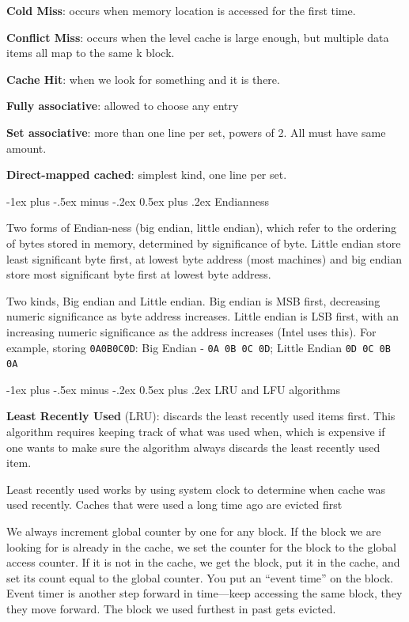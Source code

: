 \documentclass[10pt,landscape]{article}
\makeatletter
\renewcommand{\section}{\@startsection{section}{1}{0mm}%
                                {-1ex plus -.5ex minus -.2ex}%
                                {0.5ex plus .2ex}%
                                {\normalfont\large\bfseries}}
\makeatother
\begin{document}
\begin{multicols}{3}
{\bf Cold Miss}: occurs when memory location is accessed for the first time. 

{\bf Conflict Miss}:  occurs when the level cache is large enough, but multiple data items all map to the same k block. 

{\bf Cache Hit}: when we look for something and it is there. 


{\bf Fully associative}: allowed to choose any entry

{\bf Set associative}:  more than one line per set, powers of 2. All
must have same amount.

{\bf Direct-mapped cached}: simplest kind, one line per set.

\section{Endianness}

Two forms of Endian-ness (big endian, little endian), which refer to the ordering of bytes stored in memory, determined by significance of byte. 
Little endian store least significant byte first, at lowest byte address (most machines) and big endian store most significant byte first at lowest 
byte address.

Two kinds, Big endian and Little endian. Big endian is MSB first,
decreasing numeric significance as byte address increases. Little
endian is LSB first, with an increasing numeric significance as the
address increases (Intel uses this). For example, storing \texttt{0A0B0C0D}:
Big Endian - \texttt{0A 0B 0C 0D}; Little Endian \texttt{0D 0C 0B 0A}

\section{LRU and LFU algorithms}

{\bf Least Recently Used} (LRU): discards the least recently used items first. This algorithm requires keeping track of what was used when, which is expensive if one wants to make sure the algorithm always discards the least recently used item.

Least recently used works by using system clock to determine when cache was used recently. Caches that were used a long time ago are evicted 
first

We always increment global counter by one for any block. If the block we are looking for is already in the cache, we set the counter for 
the block to the global access counter. If it is not in the cache, we get the block, put it in the cache, and set its count equal to the global 
counter. You put an ``event time'' on the block.  Event timer is another step forward in time—keep accessing the same block, they they 
move forward. The block we used furthest in past gets evicted.


\end{multicols}
\end{document}
